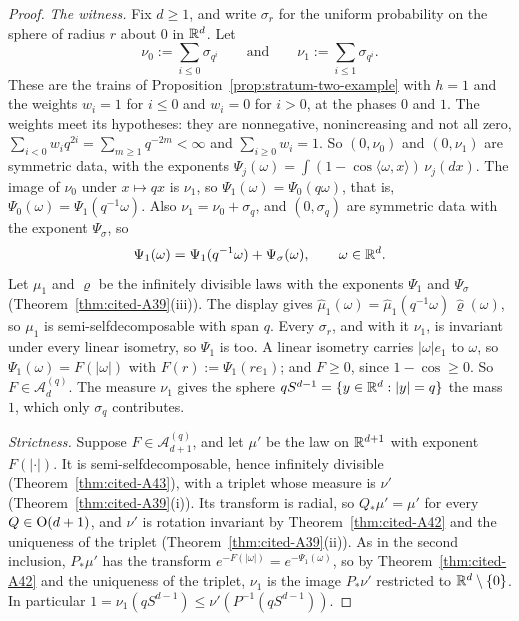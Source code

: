\begin{proof}
\emph{The witness.} Fix $d \ge 1$, and write $\sigma_r$ for the uniform probability on the sphere of
radius $r$ about $0$ in $\mathbb{R}^d$. Let
\[
  \nu_0 := \sum_{i \le 0}\sigma_{q^i} \qquad\text{and}\qquad \nu_1 := \sum_{i \le 1}\sigma_{q^i} .
\]
These are the trains of Proposition~\ref{prop:stratum-two-example} with $h = 1$ and the weights
$w_i = 1$ for $i \le 0$ and $w_i = 0$ for $i > 0$, at the phases $0$ and $1$. The weights meet its
hypotheses: they are nonnegative, nonincreasing and not all zero,
$\sum_{i < 0}w_iq^{2i} = \sum_{m \ge 1}q^{-2m} < \infty$ and $\sum_{i \ge 0}w_i = 1$. So
$(0, \nu_0)$ and $(0, \nu_1)$ are symmetric \Levy{} data, with the exponents
$\Psi_j(\omega) = \int(1 - \cos\langle\omega, x\rangle)\,\nu_j(dx)$. The image of $\nu_0$ under
$x \mapsto qx$ is $\nu_1$, so $\Psi_1(\omega) = \Psi_0(q\omega)$, that is,
$\Psi_0(\omega) = \Psi_1(q^{-1}\omega)$. Also $\nu_1 = \nu_0 + \sigma_q$, and $(0, \sigma_q)$ are
symmetric \Levy{} data with the exponent $\Psi_\sigma$, so
\[
  \Psi_1(\omega) = \Psi_1(q^{-1}\omega) + \Psi_\sigma(\omega), \qquad \omega \in \mathbb{R}^d .
\]
Let $\mu_1$ and $\varrho$ be the infinitely divisible laws with the exponents $\Psi_1$ and $\Psi_\sigma$
(Theorem~\ref{thm:cited-A39}(iii)). The display gives
$\widehat\mu_1(\omega) = \widehat\mu_1(q^{-1}\omega)\,\widehat\varrho(\omega)$, so $\mu_1$ is
semi-selfdecomposable with span $q$. Every $\sigma_r$, and with it $\nu_1$, is invariant under every
linear isometry, so $\Psi_1$ is too. A linear isometry carries $|\omega|e_1$ to $\omega$, so
$\Psi_1(\omega) = F(|\omega|)$ with $F(r) := \Psi_1(re_1)$; and $F \ge 0$, since $1 - \cos \ge 0$. So
$F \in \mathcal{A}^{(q)}_d$. The \Levy{} measure $\nu_1$ gives the sphere
$qS^{d-1} = \{y \in \mathbb{R}^d : |y| = q\}$ the mass $1$, which only $\sigma_q$ contributes.

\emph{Strictness.} Suppose $F \in \mathcal{A}^{(q)}_{d+1}$, and let $\mu'$ be the law on $\mathbb{R}^{d+1}$
with exponent $F(|\cdot|)$. It is semi-selfdecomposable, hence infinitely divisible
(Theorem~\ref{thm:cited-A43}), with a triplet whose \Levy{} measure is $\nu'$
(Theorem~\ref{thm:cited-A39}(i)). Its transform is radial, so $Q_*\mu' = \mu'$ for every
$Q \in \mathrm{O}(d+1)$, and $\nu'$ is rotation invariant by Theorem~\ref{thm:cited-A42} and the
uniqueness of the triplet (Theorem~\ref{thm:cited-A39}(ii)). As
in the second inclusion, $P_*\mu'$ has the transform $e^{-F(|\omega|)} = e^{-\Psi_1(\omega)}$, so by
Theorem~\ref{thm:cited-A42} and the uniqueness of the triplet, $\nu_1$ is the image
$P_*\nu'$ restricted to $\mathbb{R}^d \setminus \{0\}$. In particular
$1 = \nu_1(qS^{d-1}) \le \nu'(P^{-1}(qS^{d-1}))$.


\end{proof}
